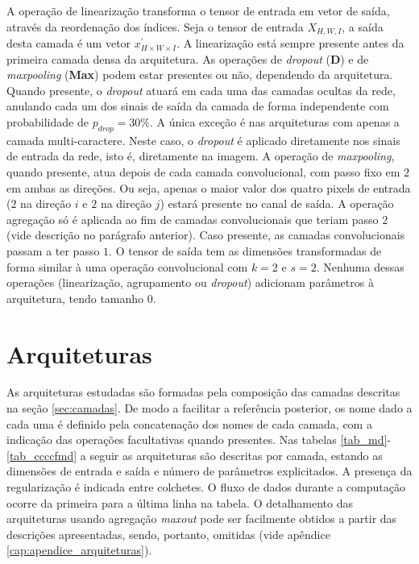 A operação de linearização transforma o tensor de entrada em vetor de saída, através da reordenação dos índices. Seja o tensor de entrada $X_{H, W, I}$, a saída desta camada é um vetor $x^{'}_{H \times W \times I}$. A linearização está sempre presente antes da primeira camada densa da arquitetura. As operações de \textit{dropout} (\textbf{D}) e de \textit{maxpooling} (\textbf{Max}) podem estar presentes ou não, dependendo da arquitetura. Quando presente, o \textit{dropout} atuará em cada uma das camadas ocultas da rede, anulando cada um dos sinais de saída da camada de forma independente com probabilidade de $p_{drop} = 30\%$. A única exceção é nas arquiteturas com apenas a camada multi-caractere. Neste caso, o \textit{dropout} é aplicado diretamente nos sinais de entrada da rede, isto é, diretamente na imagem. A operação de \textit{maxpooling}, quando presente, atua depois de cada camada convolucional, com passo fixo em $2$ em ambas as direções. Ou seja, apenas o maior valor dos quatro pixels de entrada ($2$ na direção $i$ e $2$ na direção $j$) estará presente no canal de saída. A operação agregação só é aplicada ao fim de camadas convolucionais que teriam passo $2$ (vide descrição no parágrafo anterior). Caso presente, as camadas convolucionais passam a ter passo $1$. O tensor de saída tem as dimensões transformadas de forma similar à uma operação convolucional com $k = 2$ e $s = 2$. Nenhuma dessas operações (linearização, agrupamento ou \textit{dropout}) adicionam parâmetros à arquitetura, tendo tamanho $0$.

\section{Arquiteturas}

As arquiteturas estudadas são formadas pela composição das camadas descritas na seção \ref{sec:camadas}. De modo a facilitar a referência posterior, os nome dado a cada uma é definido pela concatenação dos nomes de cada camada, com a indicação das operações facultativas quando presentes. Nas tabelas \ref{tab_md}-\ref{tab_ccccfmd} a seguir as arquiteturas são descritas por camada, estando as dimensões de entrada e saída e número de parâmetros explicitados. A presença da regularização é indicada entre colchetes. O fluxo de dados durante a computação ocorre da primeira para a última linha na tabela. O detalhamento das arquiteturas usando agregação \textit{maxout} pode ser facilmente obtidos a partir das descrições apresentadas, sendo, portanto, omitidas (vide apêndice \ref{cap:apendice_arquiteturas}).

